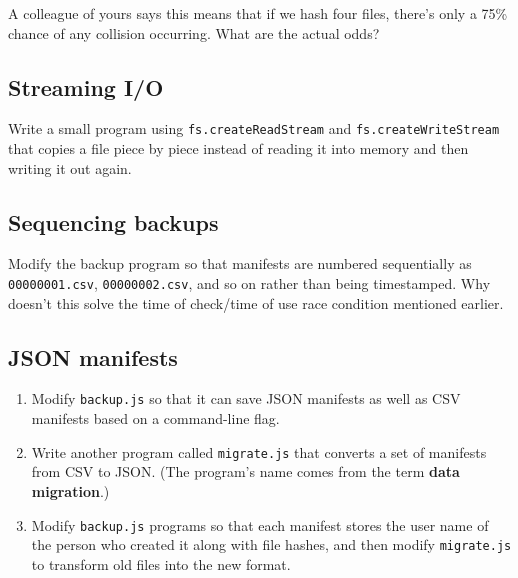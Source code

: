 \documentclass[krantzl]{krantz}
\newcommand{\glossref}[1]{\textbf{#1}}
\begin{document}
\vspace{\baselineskip}


A colleague of yours says this means that if we hash four files,
there's only a 75\% chance of any collision occurring.
What are the actual odds?

\subsection*{Streaming I/O}


Write a small program using \texttt{fs.createReadStream} and \texttt{fs.createWriteStream}
that copies a file piece by piece
instead of reading it into memory and then writing it out again.

\subsection*{Sequencing backups}


Modify the backup program so that manifests are numbered sequentially
as \texttt{00000001.csv}, \texttt{00000002.csv}, and so on
rather than being timestamped.
Why doesn't this solve the time of check/time of use race condition mentioned earlier.

\subsection*{JSON manifests}

\begin{enumerate}

\item 

Modify \texttt{backup.js} so that it can save JSON manifests as well as CSV manifests
    based on a command-line flag.



\item 

Write another program called \texttt{migrate.js} that converts a set of manifests
    from CSV to JSON.
    (The program's name comes from the term \glossref{data migration}.)



\item 

Modify \texttt{backup.js} programs so that each manifest stores the user name of the person who created it
    along with file hashes,
    and then modify \texttt{migrate.js} to transform old files into the new format.



\end{enumerate}
\end{document}
